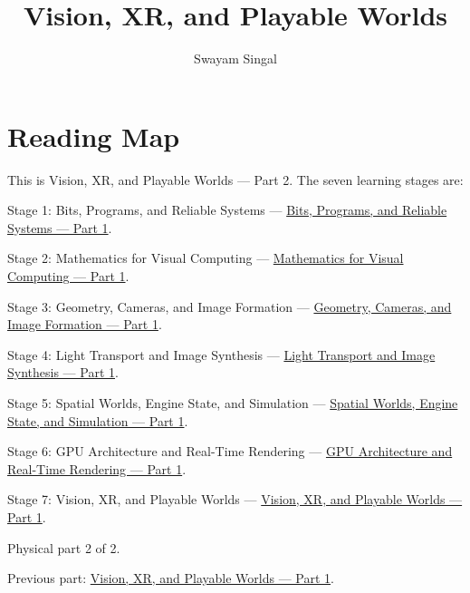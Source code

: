 \documentclass[11pt,twoside,openany]{book}
\title{Vision, XR, and Playable Worlds}
\author{Swayam Singal}
\begin{document}
\maketitle
\begin{center}\end{center}
\chapter*{Reading Map}
\hypertarget{volume-reading-map}{}
\noindent This is Vision, XR, and Playable Worlds --- Part 2. The seven learning stages are:
\par\noindent Stage 1: Bits, Programs, and Reliable Systems --- \href{../01-Bits-Programs-and-Reliable-Systems-P01/main.pdf}{Bits, Programs, and Reliable Systems — Part 1}.
\par\noindent Stage 2: Mathematics for Visual Computing --- \href{../02-Mathematics-for-Visual-Computing-P01/main.pdf}{Mathematics for Visual Computing — Part 1}.
\par\noindent Stage 3: Geometry, Cameras, and Image Formation --- \href{../03-Geometry-Cameras-and-Image-Formation-P01/main.pdf}{Geometry, Cameras, and Image Formation — Part 1}.
\par\noindent Stage 4: Light Transport and Image Synthesis --- \href{../04-Light-Transport-and-Image-Synthesis-P01/main.pdf}{Light Transport and Image Synthesis — Part 1}.
\par\noindent Stage 5: Spatial Worlds, Engine State, and Simulation --- \href{../05-Spatial-Worlds-Engine-State-and-Simulation-P01/main.pdf}{Spatial Worlds, Engine State, and Simulation — Part 1}.
\par\noindent Stage 6: GPU Architecture and Real-Time Rendering --- \href{../06-GPU-Architecture-and-Real-Time-Rendering-P01/main.pdf}{GPU Architecture and Real-Time Rendering — Part 1}.
\par\noindent Stage 7: Vision, XR, and Playable Worlds --- \href{../07-Vision-XR-and-Playable-Worlds-P01/main.pdf}{Vision, XR, and Playable Worlds — Part 1}.
\par\noindent Physical part 2 of 2.
\par\noindent Previous part: \href{../07-Vision-XR-and-Playable-Worlds-P01/main.pdf}{Vision, XR, and Playable Worlds — Part 1}.
\tableofcontents
\mainmatter
\setcounter{chapter}{7}


\end{document}
